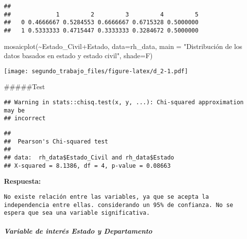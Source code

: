 \documentclass[
]{article}
\newenvironment{Shaded}{\begin{snugshade}}{\end{snugshade}}
\newcommand{\AttributeTok}[1]{\textcolor[rgb]{0.77,0.63,0.00}{#1}}
\newcommand{\FunctionTok}[1]{\textcolor[rgb]{0.00,0.00,0.00}{#1}}
\newcommand{\NormalTok}[1]{#1}
\newcommand{\SpecialCharTok}[1]{\textcolor[rgb]{0.00,0.00,0.00}{#1}}
\newcommand{\StringTok}[1]{\textcolor[rgb]{0.31,0.60,0.02}{#1}}
\begin{document}
\begin{verbatim}
##    
##             1         2         3         4         5
##   0 0.4666667 0.5284553 0.6666667 0.6715328 0.5000000
##   1 0.5333333 0.4715447 0.3333333 0.3284672 0.5000000
\end{verbatim}

\begin{Shaded}
\begin{Highlighting}[]
\FunctionTok{mosaicplot}\NormalTok{(}\SpecialCharTok{\textasciitilde{}}\NormalTok{Estado\_Civil}\SpecialCharTok{+}\NormalTok{Estado, }\AttributeTok{data=}\NormalTok{rh\_data, }\AttributeTok{main =} \StringTok{"Distribución de los datos basados en estado y estado civil"}\NormalTok{, }\AttributeTok{shade=}\NormalTok{F)}
\end{Highlighting}
\end{Shaded}

\texttt{[image: segundo\_trabajo\_files/figure-latex/d\_2-1.pdf]}

\#\#\#\#\#Test

\begin{Shaded}
\end{Shaded}

\begin{verbatim}
## Warning in stats::chisq.test(x, y, ...): Chi-squared approximation may be
## incorrect
\end{verbatim}

\begin{verbatim}
## 
##  Pearson's Chi-squared test
## 
## data:  rh_data$Estado_Civil and rh_data$Estado
## X-squared = 8.1386, df = 4, p-value = 0.08663
\end{verbatim}

\textbf{Respuesta:}

\begin{verbatim}
No existe relación entre las variables, ya que se acepta la independencia entre ellas. considerando un 95% de confianza. No se espera que sea una variable significativa.
\end{verbatim}

\hypertarget{variable-de-interuxe9s-estado-y-departamento}{%
\subparagraph{Variable de interés Estado y
Departamento}\label{variable-de-interuxe9s-estado-y-departamento}}
\end{document}

